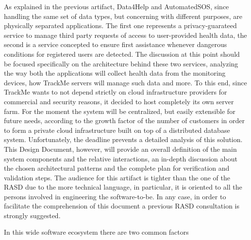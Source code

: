 


{}
As explained in the previous artifact, Data4Help and AutomatedSOS, since handling the same set of data types, but concerning with different purposes, are physically separated applications. The first one represents a privacy-guarateed service to manage third party requests of access to user-provided health data, the second is a service concepted to ensure first assistance whenever dangerous conditions for registered users are detected. The discussion at this point should be focused specifically on the architecture behind these two services, analyzing the way both the applications will collect health data from the monitoring devices, how TrackMe servers will manage such data and more. To this end, since TrackMe wants to not depend strictly on cloud infrastructure providers for commercial and security reasons, it decided to host completely its own server farm. For the moment the system will be centralized, but easily extensible for future needs, according to the growth factor of the number of customers in order to form a private cloud infrastructure built on top of a distributed database system. Unfortunately, the deadline prevents a detailed analysis of this solution. This Design Document, however, will provide an overall definition of the main system components and the relative interactions, an in-depth discussion about the chosen architectural patterns and the complete plan for verification and validation steps. The audience for this artifact is tighter than the one of the RASD due to the more technical language, in particular, it is oriented to all the persons involved in engineering the software-to-be. In any case, in order to facilitate the comprehension of this document a previous RASD consultation is strongly suggested.

{}
In this wide software ecosystem there are two common factors





{}


{}


{}


{}


